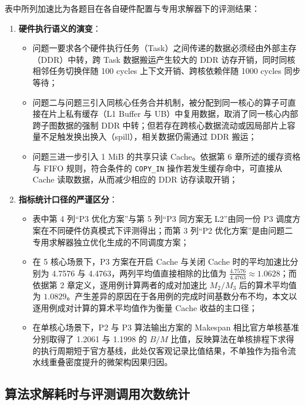 \documentclass[anonymous,withtoc]{gmcm2026}
\providecommand{\tightlist}{\setlength{\itemsep}{0pt}\setlength{\parskip}{0pt}}
\begin{document}
表中所列加速比为各题目在各自硬件配置与专用求解器下的评测结果：

\begin{enumerate}
\def\labelenumi{\arabic{enumi}.}
\tightlist
\item
  \textbf{硬件执行语义的演变}：

  \begin{itemize}
  \tightlist
  \item
    问题一要求各个硬件执行任务（Task）之间传递的数据必须经由外部主存（DDR）中转，跨 Task 数据搬运产生较大的 DDR 访存开销，同时同核相邻任务切换伴随 100 cycles 上下文开销、跨核依赖伴随 1000 cycles 同步等待；
  \item
    问题二与问题三引入同核心任务合并机制，被分配到同一核心的算子可直接在片上私有缓存（L1 Buffer 与 UB）中复用数据，取消了同一核心内部跨子图数据的强制 DDR 中转；但若存在跨核心数据流动或因局部片上容量不足触发换出换入（spill），相关数据仍需通过 DDR 搬运；
  \item
    问题三进一步引入 1 MiB 的共享只读 Cache。依据第 6 章所述的缓存资格与 FIFO 规则，符合条件的 \texttt{COPY\_IN} 操作若发生缓存命中，可直接从 Cache 读取数据，从而减少相应的 DDR 访存读取开销；
  \end{itemize}
\item
  \textbf{指标统计口径的严谨区分}：

  \begin{itemize}
  \tightlist
  \item
    表中第 4 列``P3 优化方案''与第 5 列``P3 同方案无 L2''由同一份 P3 调度方案在不同硬件仿真模式下评测得出；而第 3 列``P2 优化方案''是由问题二专用求解器独立优化生成的不同调度方案；
  \item
    在 5 核心场景下，P3 方案在开启 Cache 与关闭 Cache 时的平均加速比分别为 4.7576 与 4.4763，两列平均值直接相除的比值为 \(\frac{4.7576}{4.4763} \approx 1.0628\)；而依据第 2 章定义，逐用例计算两者的成对加速比 \(M_2/M_3\) 后的算术平均值为 \(1.0829\)。产生差异的原因在于各用例的完成时间基数分布不均，本文以逐用例成对计算的算术平均值作为衡量 Cache 收益的主口径；
  \item
    在单核心场景下，P2 与 P3 算法输出方案的 Makespan 相比官方单核基准分别取得了 1.2061 与 1.1998 的 \(B/M\) 比值，反映算法在单核排程下求得的执行周期短于官方基线，此处仅客观记录比值结果，不单独作为指令流水线重叠密度提升的微架构因果归因。
  \end{itemize}
\end{enumerate}

\subsection{算法求解耗时与评测调用次数统计}
\end{document}
